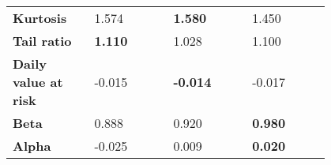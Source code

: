 \begin{table}[ht!]
{\begin{tabular}{*{4}{|m{0.20\linewidth}|}}
                      \bfseries Kurtosis            & 1.574                                & \color[HTML]{00F000} \bfseries 1.580  & 1.450 \\[0.5cm]
                      \bfseries Tail ratio          & \color[HTML]{00F000} \bfseries 1.110 & 1.028                                 & 1.100 \\[0.5cm]
                      \bfseries Daily value at risk & -0.015                               & \color[HTML]{00F000} \bfseries -0.014 & -0.017 \\[0.5cm]
                      \bfseries Beta                & 0.888                                & 0.920                                 & \color[HTML]{00F000} \bfseries 0.980 \\[0.5cm]
                      \bfseries Alpha               & -0.025                               & 0.009                                 & \color[HTML]{00F000} \bfseries 0.020 \\[0.5cm]
                      \bottomrule
    \end{tabular}}
\end{table}

